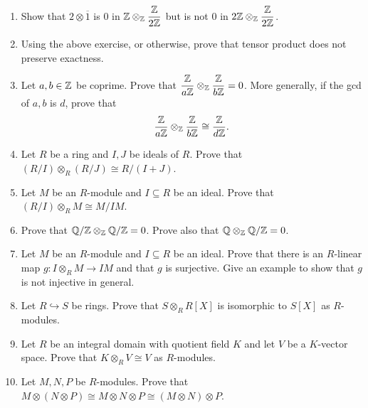 \begin{enumerate}[label=\arabic*.]

\item Show that $2 \otimes \overline 1$ is $0$ in $\mathbb{Z} \otimes_{\mathbb{Z}} \dfrac{\mathbb{Z}}{2\mathbb{Z}}$ but is not $0$ in $2\mathbb{Z} \otimes_{\mathbb{Z}} \dfrac{\mathbb{Z}}{2\mathbb{Z}}$.

\item Using the above exercise, or otherwise, prove that tensor product does not preserve exactness.

\item Let $a,b \in \mathbb{Z}$ be coprime. Prove that $\dfrac{\mathbb{Z}}{a\mathbb{Z}} \otimes_{\mathbb{Z}} \dfrac{\mathbb{Z}}{b\mathbb{Z}} = 0$. More generally, if the gcd of $a,b$ is $d$, prove that
\[
\frac{\mathbb{Z}}{a\mathbb{Z}} \otimes_{\mathbb{Z}} \frac{\mathbb{Z}}{b\mathbb{Z}} \cong \frac{\mathbb{Z}}{d\mathbb{Z}}.
\]

\item Let $R$ be a ring and $I,J$ be ideals of $R$. Prove that $(R/I) \otimes_R (R/J) \cong R/(I+J)$.

\item Let $M$ be an $R$-module and $I \subseteq R$ be an ideal. Prove that $(R/I) \otimes_R M \cong M/IM$.

\item Prove that $\mathbb{Q}/\mathbb{Z} \otimes_{\mathbb{Z}} \mathbb{Q}/\mathbb{Z} = 0$. Prove also that $\mathbb{Q} \otimes_{\mathbb{Z}} \mathbb{Q}/\mathbb{Z} = 0$.

\item Let $M$ be an $R$-module and $I \subseteq R$ be an ideal. Prove that there is an $R$-linear map $g: I \otimes_R M \to IM$ and that $g$ is surjective. Give an example to show that $g$ is not injective in general.

\item Let $R \hookrightarrow S$ be rings. Prove that $S \otimes_R R[X]$ is isomorphic to $S[X]$ as $R$-modules.

\item Let $R$ be an integral domain with quotient field $K$ and let $V$ be a $K$-vector space. Prove that $K \otimes_R V \cong V$ as $R$-modules.

\item Let $M,N,P$ be $R$-modules. Prove that $M \otimes (N\otimes P) \cong M\otimes N \otimes P \cong (M\otimes N)\otimes P$.

\end{enumerate}